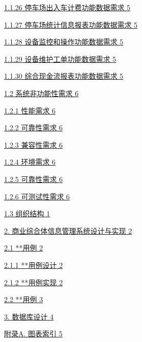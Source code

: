 \documentclass[]{article}
\begin{document}
\protect\hyperlink{ux505cux8f66ux573aux51faux5165ux8f66ux8ba1ux8d39ux529fux80fdux6570ux636eux9700ux6c42}{1.1.26
停车场出入车计费功能数据需求 5}

\protect\hyperlink{ux505cux8f66ux573aux7edfux8ba1ux4fe1ux606fux62a5ux8868ux529fux80fdux6570ux636eux9700ux6c42}{1.1.27
停车场统计信息报表功能数据需求 5}

\protect\hyperlink{ux8bbeux5907ux76d1ux63a7ux548cux64cdux4f5cux529fux80fdux6570ux636eux9700ux6c42}{1.1.28
设备监控和操作功能数据需求 5}

\protect\hyperlink{ux8bbeux5907ux7ef4ux62a4ux5de5ux5355ux529fux80fdux6570ux636eux9700ux6c42}{1.1.29
设备维护工单功能数据需求 5}

\protect\hyperlink{ux7efcux5408ux73b0ux91d1ux6d41ux62a5ux8868ux529fux80fdux6570ux636eux9700ux6c42}{1.1.30
综合现金流报表功能数据需求 5}

\protect\hyperlink{ux7cfbux7edfux975eux529fux80fdux6027ux9700ux6c42}{1.2
系统非功能性需求 6}

\protect\hyperlink{ux6027ux80fdux9700ux6c42}{1.2.1 性能需求 6}

\protect\hyperlink{ux53efux9760ux6027ux9700ux6c42}{1.2.2 可靠性需求 6}

\protect\hyperlink{ux517cux5bb9ux6027ux9700ux6c42}{1.2.3 兼容性需求 6}

\protect\hyperlink{ux73afux5883ux9700ux6c42}{1.2.4 环境需求 6}

\protect\hyperlink{ux53efux9760ux6027ux9700ux6c42-1}{1.2.5 可靠性需求 6}

\protect\hyperlink{ux53efux6d4bux8bd5ux6027ux9700ux6c42}{1.2.6
可测试性需求 6}

\protect\hyperlink{_Toc77076515}{{1.3} {组织结构} 1}

\protect\hyperlink{ux5546ux4e1aux7efcux5408ux4f53ux4fe1ux606fux7ba1ux7406ux7cfbux7edfux8bbeux8ba1ux4e0eux5b9eux73b0}{{2.}
商业综合体信息管理{系统设计与实现} 2}

\protect\hyperlink{ux7528ux6237ux7528ux4f8b}{{2.1} {**用例} 2}

\protect\hyperlink{ux7528ux6237ux7528ux4f8bux8bbeux8ba1}{{2.1.1}
{**用例设计} 2}

\protect\hyperlink{ux7528ux6237ux7528ux4f8bux5b9eux73b0}{{2.1.2}
{**用例实现} 2}

\protect\hyperlink{ux7528ux4f8b}{{2.2} {**用例} 3}

\protect\hyperlink{ux6570ux636eux5e93ux8bbeux8ba1}{{3.} {数据库设计} 4}

\protect\hyperlink{_Toc77076522}{{附录A.} {图表索引} 5}
\end{document}
